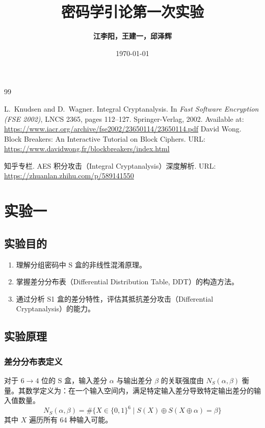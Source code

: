 \documentclass[12pt,a4paper]{article}
\title{
\textbf{\LARGE{密码学引论第一次实验}}\\[0.5em]
}
\author{\textbf{江李阳，王建一，邱泽辉}}
\date{\today}
\begin{document}
\begin{thebibliography}{99}

L.~Knudsen and D.~Wagner.
\newblock Integral Cryptanalysis.
\newblock In {\em Fast Software Encryption (FSE 2002)}, 
  LNCS 2365, pages 112--127. Springer-Verlag, 2002.
\newblock Available at: \url{https://www.iacr.org/archive/fse2002/23650114/23650114.pdf}
David Wong.
\newblock Block Breakers: An Interactive Tutorial on Block Ciphers.
\newblock URL: \url{https://www.davidwong.fr/blockbreakers/index.html}

知乎专栏.
\newblock AES 积分攻击（Integral Cryptanalysis）深度解析.
\newblock URL: \url{https://zhuanlan.zhihu.com/p/589141550}
\end{thebibliography}

\maketitle
\thispagestyle{fancy} %
\section{实验一}
\subsection{实验目的}
\begin{enumerate}
    \item 理解分组密码中 S 盒的非线性混淆原理。
    \item 掌握差分分布表（Differential Distribution Table, DDT）的构造方法。
    \item 通过分析 S1 盒的差分特性，评估其抵抗差分攻击（Differential Cryptanalysis）的能力。
\end{enumerate}

\subsection{实验原理}
\subsubsection{差分分布表定义}
对于 $6 \to 4$ 位的 S 盒，输入差分 $\alpha$ 与输出差分 $\beta$ 的关联强度由 $N_S(\alpha, \beta)$ 衡量。其数学定义为：在一个输入空间内，满足特定输入差分导致特定输出差分的输入值数量。
$$ N_S(\alpha, \beta) = \# \{ X \in \{0,1\}^6 \mid S(X) \oplus S(X \oplus \alpha) = \beta \} $$
其中 $X$ 遍历所有 64 种输入可能。
\end{document}
